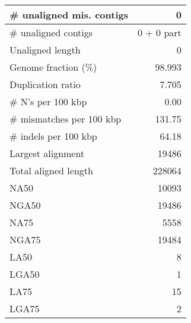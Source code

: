 \documentclass[12pt,a4paper]{article}
\begin{document}
\begin{table}[ht]
\begin{center}
\begin{tabular}{|l*{1}{|r}|}
\# unaligned mis. contigs & 0 \\ \hline
\# unaligned contigs & 0 + 0 part \\ \hline
Unaligned length & 0 \\ \hline
Genome fraction (\%) & 98.993 \\ \hline
Duplication ratio & 7.705 \\ \hline
\# N's per 100 kbp & 0.00 \\ \hline
\# mismatches per 100 kbp & 131.75 \\ \hline
\# indels per 100 kbp & 64.18 \\ \hline
Largest alignment & 19486 \\ \hline
Total aligned length & 228064 \\ \hline
NA50 & 10093 \\ \hline
NGA50 & 19486 \\ \hline
NA75 & 5558 \\ \hline
NGA75 & 19484 \\ \hline
LA50 & 8 \\ \hline
LGA50 & 1 \\ \hline
LA75 & 15 \\ \hline
LGA75 & 2 \\ \hline
\end{tabular}
\end{center}
\end{table}
\end{document}
